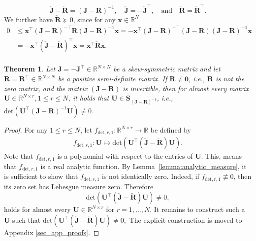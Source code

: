 \documentclass{article}
\newtheorem{theorem}{Theorem}[section]
\newcommand{\bmU}{\bm{U}}
\newcommand{\bmJ}{\bm{J}}
\newcommand{\bmR}{\bm{R}}
\newcommand{\R}{\mathbb{R}}
\newcommand{\statex}{{\bm x}}
\newcommand{\bzero}{\mathbf{0}}
\newcommand{\FOMsize}{N}
\newcommand{\ROMsize}{r}
\newcommand{\matset}{\mathbf{S}}
\newcommand{\Jcheck}{\check{\bmJ}}
\newcommand{\Rcheck}{\check{\bmR}}
\begin{document}
			\begin{equation*}
				\Jcheck-\Rcheck=(\bmJ-\bmR)^{-1},\quad
				\Jcheck = -\Jcheck^{\top}, \quad \text{and}
				\quad\Rcheck = \Rcheck^{\top}.
			\end{equation*}
			We further have $\Rcheck \succeq 0$, since for any $\statex\in\R^{\FOMsize}$
			\begin{equation*}
				\begin{aligned}
					0&\leq
					\statex^{\top}
					(\bmJ-\bmR)^{-\top}
					\bmR
					(\bmJ-\bmR)^{-1}
					\statex
					=
					-\statex^{\top}
					(\bmJ-\bmR)^{-\top}
					(\bmJ-\bmR)
					(\bmJ-\bmR)^{-1}
					\statex\\
					&=
					-\statex^{\top}
					(\Jcheck-\Rcheck)^{\top}
					\statex
					=
					\statex^{\top}
					\Rcheck
					\statex.\\
	\end{aligned}	
\end{equation*}			

\begin{theorem}
\label{Theo:exists_JR_inv}
			Let $\bmJ=-\bmJ^{\top}\in\R^{\FOMsize\times \FOMsize}$ be a skew-symmetric matrix and let $\bmR=\bmR^{\top}\in\R^{\FOMsize\times\FOMsize}$ be a positive semi-definite matrix. If $\bmR\neq\bzero$, i.e., $\bmR$ is not the zero matrix, and the matrix $(\bmJ-\bmR)$ is invertible, then for almost every matrix $\bmU\in \R^{\FOMsize\times\ROMsize}, 1\leq\ROMsize\leq\FOMsize$, it holds that $\bmU\in\matset_{(\bmJ-\bmR)^{-1}}$, i.e., $\mathrm{det}\left(\bmU^{\top}(\bmJ-\bmR)^{-1}\bmU\right)\neq 0$.
\end{theorem}	
\begin{proof}
For any $1\le\ROMsize\leq \FOMsize$, let $f_{\mathrm{det},\ROMsize,1}\colon\R^{\FOMsize\times\ROMsize}\rightarrow \R$ be defined by 
			\begin{align*}
				f_{\mathrm{det},\ROMsize,1}\colon\bmU\mapsto \allowbreak \mathrm{det}\left(\bmU^{\top}\left(\Jcheck-\Rcheck\right)\bmU\right).
			\end{align*}
			Note that $f_{\mathrm{det},\ROMsize,1}$ is a polynomial with respect to the entries of $\bmU$. This, means that $f_{\mathrm{det},\ROMsize,1}$ is a real analytic function.
			By Lemma~\ref{lemma:analytic_measure}, it is sufficient to show that $f_{\mathrm{det},\ROMsize,1}$ is not identically zero. Indeed, if $f_{\mathrm{det},\ROMsize,1} \not\equiv 0$, then its zero set has Lebesgue measure zero. Therefore 
			\begin{equation*}
				\mathrm{det}\left(\bmU^{\top}\left(\Jcheck-\Rcheck\right)\bmU\right)\neq 0,
			\end{equation*}
			holds for almost every $ \bmU\in\R^{\FOMsize\times \ROMsize} $ for $\ROMsize=1,\ldots,\FOMsize$. It remains to construct such a $\bmU$ such that $\mathrm{det}\left(\bmU^{\top}\left(\Jcheck-\Rcheck\right)\bmU\right)\neq 0,$ The explicit construction is moved to  Appendix \ref{sec_app_proofs}. 
\end{proof}
					
\end{document}
